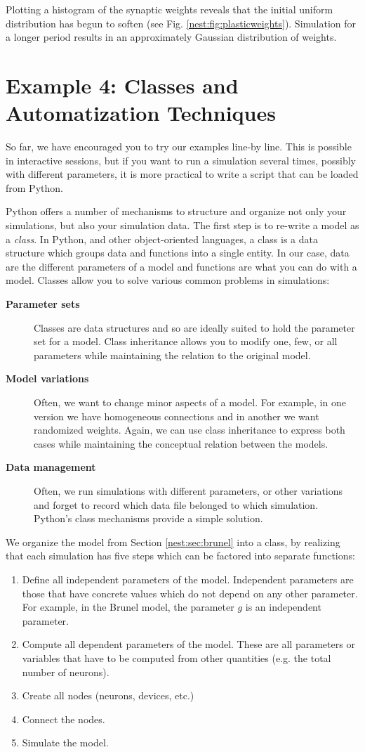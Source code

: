 \documentclass{article}
\begin{document}
Plotting a histogram of the synaptic weights reveals that the initial
uniform distribution has begun to soften
(see Fig. \ref{nest:fig:plasticweights}). Simulation for a longer period
results in an approximately Gaussian distribution of weights.

\section{Example 4: Classes and Automatization Techniques} 
So far, we have encouraged you to try our examples line-by line. This
is possible in interactive sessions, but if you want to run a
simulation several times, possibly with different parameters, it is
more practical to write a script that can be loaded from Python.

Python offers a number of mechanisms to structure and organize not
only your simulations, but also your simulation data.  The first step
is to re-write a model as a \emph{class}. In Python, and other
object-oriented languages, a class is a data structure which groups
data and functions into a single entity. In our case, data are the
different parameters of a model and functions are what you can do with
a model.
Classes allow you to solve various common problems in simulations:
\begin{description}
\item[\bf Parameter sets] Classes are data structures and so are
  ideally suited to hold the parameter set for a model. Class inheritance
  allows you to modify one, few, or all parameters while maintaining
  the relation to the original model.
\item[\bf Model variations] Often, we want to change minor aspects of
  a model. For example, in one version we have homogeneous connections
  and in another we want randomized weights. Again, we can use class
  inheritance to express both cases while maintaining the conceptual
  relation between the models.
\item[\bf Data management] Often, we run simulations with different
  parameters, or other variations and forget to record which data file
  belonged to which simulation. Python's class mechanisms provide a
  simple solution.
\end{description}
We organize the model from Section \ref{nest:sec:brunel} into a class,
by realizing that each simulation has five steps which can be factored
into separate functions:
\begin{enumerate}
\item Define all independent parameters of the model. Independent
  parameters are those that have concrete values which do not depend
  on any other parameter. For example, in the Brunel model, the
  parameter $g$ is an independent parameter.
\item Compute all dependent parameters of the model. These are all
  parameters or variables that have to be computed from other
  quantities (e.g. the total number of neurons).
\item Create all nodes (neurons, devices, etc.)
\item Connect the nodes.
\item Simulate the model.
\end{enumerate}
\end{document}

